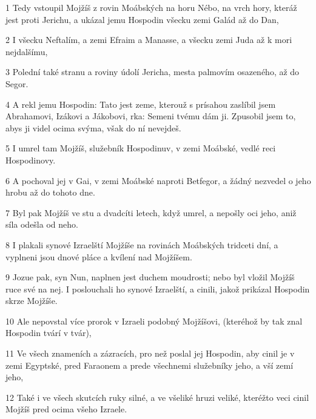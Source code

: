 \par 1 Tedy vstoupil Mojžíš z rovin Moábských na horu Nébo, na vrch hory, kteráž jest proti Jerichu, a ukázal jemu Hospodin všecku zemi Galád až do Dan,
\par 2 I všecku Neftalím, a zemi Efraim a Manasse, a všecku zemi Juda až k mori nejdalšímu,
\par 3 Polední také stranu a roviny údolí Jericha, mesta palmovím osazeného, až do Segor.
\par 4 A rekl jemu Hospodin: Tato jest zeme, kterouž s prísahou zaslíbil jsem Abrahamovi, Izákovi a Jákobovi, rka: Semeni tvému dám ji. Zpusobil jsem to, abys ji videl ocima svýma, však do ní nevejdeš.
\par 5 I umrel tam Mojžíš, služebník Hospodinuv, v zemi Moábské, vedlé reci Hospodinovy.
\par 6 A pochoval jej v Gai, v zemi Moábské naproti Betfegor, a žádný nezvedel o jeho hrobu až do tohoto dne.
\par 7 Byl pak Mojžíš ve stu a dvadcíti letech, když umrel, a nepošly oci jeho, aniž síla odešla od neho.
\par 8 I plakali synové Izraelští Mojžíše na rovinách Moábských tridceti dní, a vyplneni jsou dnové pláce a kvílení nad Mojžíšem.
\par 9 Jozue pak, syn Nun, naplnen jest duchem moudrosti; nebo byl vložil Mojžíš ruce své na nej. I poslouchali ho synové Izraelští, a cinili, jakož prikázal Hospodin skrze Mojžíše.
\par 10 Ale nepovstal více prorok v Izraeli podobný Mojžíšovi, (kteréhož by tak znal Hospodin tvárí v tvár),
\par 11 Ve všech znameních a zázracích, pro než poslal jej Hospodin, aby cinil je v zemi Egyptské, pred Faraonem a prede všechnemi služebníky jeho, a vší zemí jeho,
\par 12 Také i ve všech skutcích ruky silné, a ve všeliké hruzi veliké, kteréžto veci cinil Mojžíš pred ocima všeho Izraele.



